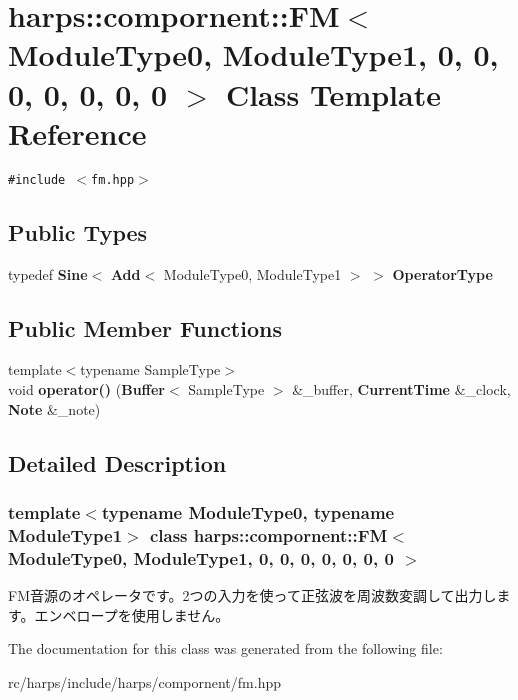 \section{harps::compornent::FM$<$ ModuleType0, ModuleType1, 0, 0, 0, 0, 0, 0, 0 $>$ Class Template Reference}
\label{classharps_1_1compornent_1_1FM_3_01ModuleType0_00_01ModuleType1_00_010_00_010_00_010_00_010_00_010_00_010_00_010_01_4}
{\tt \#include $<$fm.hpp$>$}

\subsection*{Public Types}
\begin{CompactItemize}
\item 
typedef {\bf Sine}$<$ {\bf Add}$<$ ModuleType0, ModuleType1 $>$ $>$ \textbf{OperatorType}\label{classharps_1_1compornent_1_1FM_3_01ModuleType0_00_01ModuleType1_00_010_00_010_00_010_00_010_00_010_00_010_00_010_01_4_f3ba3681fb3c1359e998c28cceca9474}

\end{CompactItemize}
\subsection*{Public Member Functions}
\begin{CompactItemize}
\item 
{\footnotesize template$<$typename SampleType$>$ }\\void \textbf{operator()} ({\bf Buffer}$<$ SampleType $>$ \&\_\-buffer, {\bf CurrentTime} \&\_\-clock, {\bf Note} \&\_\-note)\label{classharps_1_1compornent_1_1FM_3_01ModuleType0_00_01ModuleType1_00_010_00_010_00_010_00_010_00_010_00_010_00_010_01_4_537f9c217e51240cf7b5215e6b4dbb55}

\end{CompactItemize}


\subsection{Detailed Description}
\subsubsection*{template$<$typename ModuleType0, typename ModuleType1$>$ class harps::compornent::FM$<$ ModuleType0, ModuleType1, 0, 0, 0, 0, 0, 0, 0 $>$}

FM音源のオペレータです。2つの入力を使って正弦波を周波数変調して出力します。エンベロープを使用しません。 

The documentation for this class was generated from the following file:\begin{CompactItemize}
\item 
rc/harps/include/harps/compornent/fm.hpp\end{CompactItemize}
